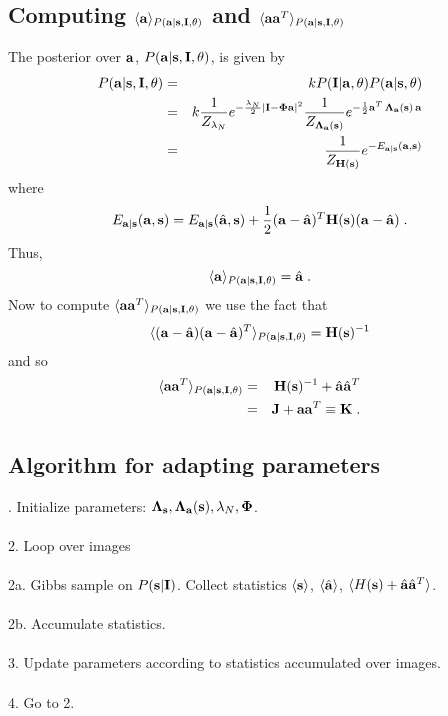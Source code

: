 \documentclass[12pt]{article}
\newcommand{\params}{\theta}
\newcommand{\ba}{{\bf a}}
\newcommand{\bah}{\hat{\bf a}}
\newcommand{\bs}{{\bf s}}
\newcommand{\bI}{{\bf I}}
\newcommand{\bPhi}{{\bf \Phi}}
\newcommand{\bLambdas}{{\bf \Lambda_s}}
\newcommand{\bLambdaa}{{\bf \Lambda_a}}
\newcommand{\bH}{{\bf H}}
\newcommand{\bJ}{{\bf J}}
\newcommand{\bK}{{\bf K}}
\begin{document}
\subsection{Computing $\langle\ba\rangle_{P(\ba|\bs,\bI,\params)}$
and $\langle\ba\ba^T\rangle_{P(\ba|\bs,\bI,\params)}$}

The posterior over $\ba$, $P(\ba|\bs,\bI,\params)$, is given by
\begin{eqnarray}
P(\ba|\bs,\bI,\params) & = & 
  k P(\bI|\ba,\params) P(\ba|\bs,\params) \\
 & = & k \frac{1}{Z_{\lambda_N}} e^{-\frac{\lambda_N}{2}|\bI-\bPhi\ba|^2}
  \frac{1}{Z_{\bLambdaa(\bs)}} e^{-\frac{1}{2} \ba^T \, \bLambdaa(\bs)\, \ba} \\
 & = & \frac{1}{Z_{\bH(\bs)}} e^{-E_{\ba|\bs}(\ba,\bs)} 
\end{eqnarray}
where 
\begin{equation}
E_{\ba|\bs}(\ba,\bs) = E_{\ba|\bs}(\bah,\bs) +
  \frac{1}{2}(\ba-\bah)^T \bH(\bs) (\ba-\bah) \; .
\end{equation}
Thus,
\begin{equation}
\langle\ba\rangle_{P(\ba|\bs,\bI,\params)} = \bah \; .
\end{equation}
Now to compute $\langle\ba\ba^T\rangle_{P(\ba|\bs,\bI,\params)}$ we use
the fact that
\begin{equation}
\langle(\ba-\bah)(\ba-\bah)^T\rangle_{P(\ba|\bs,\bI,\params)} =
  \bH(\bs)^{-1} 
\end{equation}
and so
\begin{eqnarray}
\langle\ba\ba^T\rangle_{P(\ba|\bs,\bI,\params)} 
  &  = & \bH(\bs)^{-1} + \bah\bah^T \\
  & = &  \bJ + \ba\ba^T \equiv \bK \; .
\end{eqnarray}


\subsection{Algorithm for adapting parameters}

. Initialize parameters: $\bLambdas, \bLambdaa(\bs), \lambda_N, \bPhi$.\\
\\
2. Loop over images\\
\\
\indent 2a. Gibbs sample on $P(\bs|\bI)$.  Collect statistics 
            $\langle \bs \rangle$, $\langle \bah \rangle$, 
            $\langle H(\bs) + \bah\bah^T \rangle$.\\
\\
\indent 2b. Accumulate statistics.\\
\\
3. Update parameters according to statistics accumulated over images.\\
\\
4. Go to 2.
\end{document}
